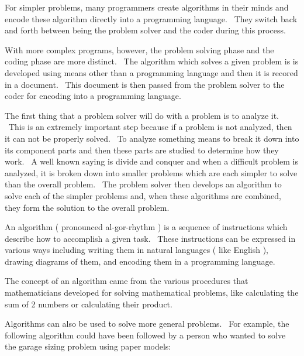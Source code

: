 \documentclass[12pt,twoside]{book}
\begin{document}
\bigskip

For simpler problems, many programmers create algorithms in their minds and encode these algorithm directly into a programming language. \ They switch back and forth between being the problem solver and the coder during this process. 

\bigskip

With more complex programs, however, the problem solving phase and the coding phase are more distinct. \ The algorithm which solves a given problem is is developed using means other than a programming language and then it is recored in a document. \ This document is then passed from the problem solver to the coder for encoding into a programming language. 

\bigskip

The first thing that a problem solver will do with a problem is to analyze it. \ This is an extremely important step because if a problem is not analyzed, then it can not be properly solved. \ To analyze something means to break it down into its component parts and then these parts are studied to determine how they work. \ A well known saying is {\textquotesingle}divide and conquer{\textquotesingle} and when a difficult problem is analyzed, it is broken down into smaller problems which are each simpler to solve than the overall problem. \ The problem solver then develops an algorithm to solve each of the simpler problems and, when these algorithms are combined, they form the solution to the overall problem. 

\bigskip

An algorithm ( pronounced al{}-gor{}-rhythm ) is a sequence of instructions which describe how to accomplish a given task. \ These instructions can be expressed in various ways including writing them in natural languages ( like English ), drawing diagrams of them, and encoding them in a programming language. 

\bigskip

The concept of an algorithm came from the various procedures that mathematicians developed for solving mathematical problems, like calculating the sum of 2 numbers or calculating their product. 

\bigskip

Algorithms can also be used to solve more general problems. \ For example, the following algorithm could have been followed by a person who wanted to solve the garage sizing problem using paper models: 

\bigskip
\end{document}
